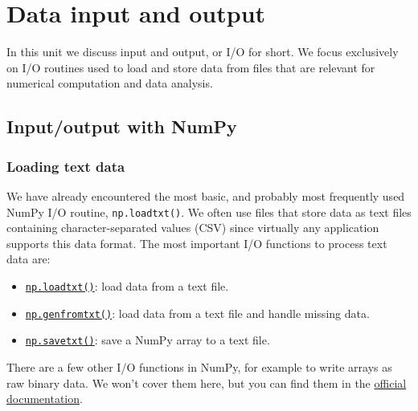 \documentclass{scrartcl}
\providecommand{\tightlist}{%
      \setlength{\itemsep}{0pt}\setlength{\parskip}{0pt}}
\begin{document}
    
    \maketitle
    \tableofcontents
    
    

    
    \hypertarget{data-input-and-output}{%
\section{Data input and output}\label{data-input-and-output}}

In this unit we discuss input and output, or I/O for short. We focus
exclusively on I/O routines used to load and store data from files that
are relevant for numerical computation and data analysis.

    \hypertarget{inputoutput-with-numpy}{%
\subsection{Input/output with NumPy}\label{inputoutput-with-numpy}}

\hypertarget{loading-text-data}{%
\subsubsection{Loading text data}\label{loading-text-data}}

We have already encountered the most basic, and probably most frequently
used NumPy I/O routine, \texttt{np.loadtxt()}. We often use files that
store data as text files containing character-separated values (CSV)
since virtually any application supports this data format. The most
important I/O functions to process text data are:

\begin{itemize}
\tightlist
\item
  \href{https://numpy.org/doc/stable/reference/generated/numpy.loadtxt.html}{\texttt{np.loadtxt()}}:
  load data from a text file.
\item
  \href{https://numpy.org/doc/stable/reference/generated/numpy.genfromtxt.html}{\texttt{np.genfromtxt()}}:
  load data from a text file and handle missing data.
\item
  \href{https://numpy.org/doc/stable/reference/generated/numpy.savetxt.html}{\texttt{np.savetxt()}}:
  save a NumPy array to a text file.
\end{itemize}

There are a few other I/O functions in NumPy, for example to write
arrays as raw binary data. We won't cover them here, but you can find
them in the
\href{https://numpy.org/doc/stable/reference/routines.io.html}{official
documentation}.
\end{document}
